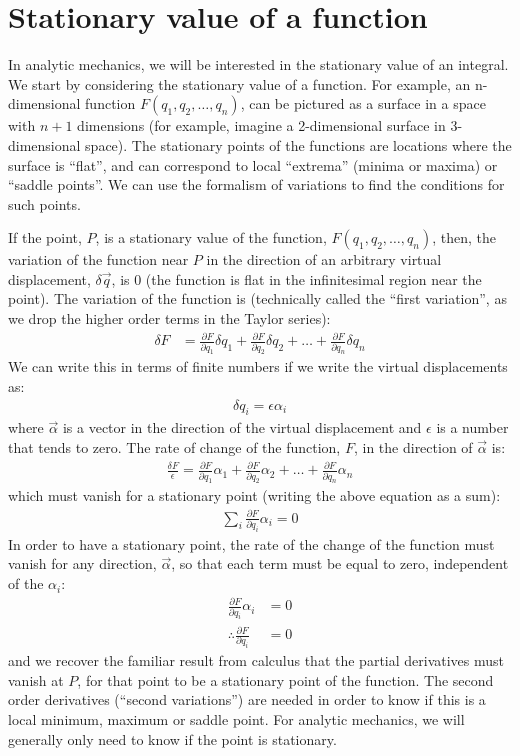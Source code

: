 \section{Stationary value of a function}
In analytic mechanics, we will be interested in the stationary value of an integral. We start by considering the stationary value of a function. For example, an n-dimensional function $F(q_1, q_2, \dots, q_n)$, can be pictured as a surface in a space with $n+1$ dimensions (for example, imagine a 2-dimensional surface in 3-dimensional space). The stationary points of the functions are locations where the surface is ``flat'', and can correspond to local ``extrema'' (minima or maxima) or ``saddle points''. We can use the formalism of variations to find the conditions for such points. 

If the point, $P$, is a stationary value of the function, $F(q_1, q_2, \dots, q_n)$, then, the variation of the function near $P$ in the direction of an arbitrary virtual displacement, $\delta\vec{q}$, is 0 (the function is flat in the infinitesimal region near the point). The variation of the function is (technically called the ``first variation'', as we drop the higher order terms in the Taylor series):
\begin{align}
\delta F&=\frac{\partial F}{\partial q_1}\delta q_1 + \frac{\partial F}{\partial q_2}\delta q_2 +\dots+\frac{\partial F}{\partial q_n}\delta q_n
\end{align}  
We can write this in terms of finite numbers if we write the virtual displacements as:
\begin{align}
\delta q_i=\epsilon \alpha_i
\end{align}
where $\vec{\alpha}$ is a vector in the direction of the virtual displacement and $\epsilon$ is a number that tends to zero. The rate of change of the function, $F$, in the direction of $\vec{\alpha}$ is:
\begin{align}
\frac{\delta F}{\epsilon}=\frac{\partial F}{\partial q_1}\alpha_1 + \frac{\partial F}{\partial q_2}\alpha_2 +\dots+\frac{\partial F}{\partial q_n}\alpha_n
\end{align} 
which must vanish for a stationary point (writing the above equation as a sum):
\begin{align}
\sum_i\frac{\partial F}{\partial q_i}\alpha_i =0
\end{align} 
In order to have a stationary point, the rate of the change of the function must vanish for any direction, $\vec{\alpha}$, so that each term must be equal to zero, independent of the $\alpha_i$:
\begin{align}
\frac{\partial F}{\partial q_i}\alpha_i &=0\nonumber\\
\therefore \frac{\partial F}{\partial q_i}&=0
\end{align}
and we recover the familiar result from calculus that the partial derivatives must vanish at $P$, for that point to be a stationary point of the function. The second order derivatives (``second variations'') are needed in order to know if this is a local minimum, maximum or saddle point. For analytic mechanics, we will generally only need to know if the point is stationary.

